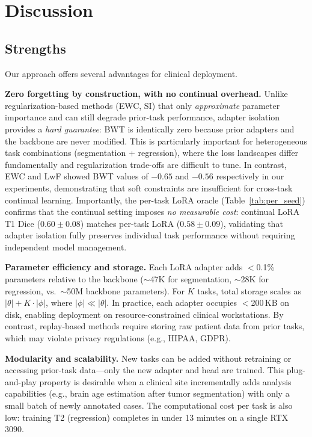 \documentclass[journal,twoside,web]{ieeecolor}
\begin{document}
\section{Discussion}
\label{sec:discussion}

\subsection{Strengths}
\label{sec:strengths}

Our approach offers several advantages for clinical deployment.

\textbf{Zero forgetting by construction, with no continual overhead.} Unlike regularization-based methods (EWC, SI) that only \emph{approximate} parameter importance and can still degrade prior-task performance, adapter isolation provides a \emph{hard guarantee}: BWT is identically zero because prior adapters and the backbone are never modified. This is particularly important for heterogeneous task combinations (segmentation + regression), where the loss landscapes differ fundamentally and regularization trade-offs are difficult to tune. In contrast, EWC and LwF showed BWT values of $-0.65$ and $-0.56$ respectively in our experiments, demonstrating that soft constraints are insufficient for cross-task continual learning. Importantly, the per-task LoRA oracle (Table~\ref{tab:per_seed}) confirms that the continual setting imposes \emph{no measurable cost}: continual LoRA T1 Dice ($0.60 \pm 0.08$) matches per-task LoRA ($0.58 \pm 0.09$), validating that adapter isolation fully preserves individual task performance without requiring independent model management.

\textbf{Parameter efficiency and storage.} Each LoRA adapter adds $<$0.1\% parameters relative to the backbone ($\sim$47K for segmentation, $\sim$28K for regression, vs.\ $\sim$50M backbone parameters). For $K$ tasks, total storage scales as $|\theta| + K \cdot |\phi|$, where $|\phi| \ll |\theta|$. In practice, each adapter occupies $<$200\,KB on disk, enabling deployment on resource-constrained clinical workstations. By contrast, replay-based methods require storing raw patient data from prior tasks, which may violate privacy regulations (e.g., HIPAA, GDPR).

\textbf{Modularity and scalability.} New tasks can be added without retraining or accessing prior-task data---only the new adapter and head are trained. This plug-and-play property is desirable when a clinical site incrementally adds analysis capabilities (e.g., brain age estimation after tumor segmentation) with only a small batch of newly annotated cases. The computational cost per task is also low: training T2 (regression) completes in under 13 minutes on a single RTX 3090.
\end{document}
